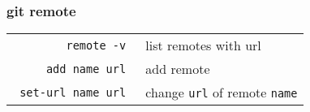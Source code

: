 \begin{multicols*}{3}
\subsubsection{git remote}
\begin{tabular}{@{}rl@{}}
    \verb| remote -v | & list remotes with url \\
    \verb| add name url | & add remote \\
    \verb| set-url name url | & change \verb|url| of remote \verb|name|
\end{tabular}

\end{multicols*}


